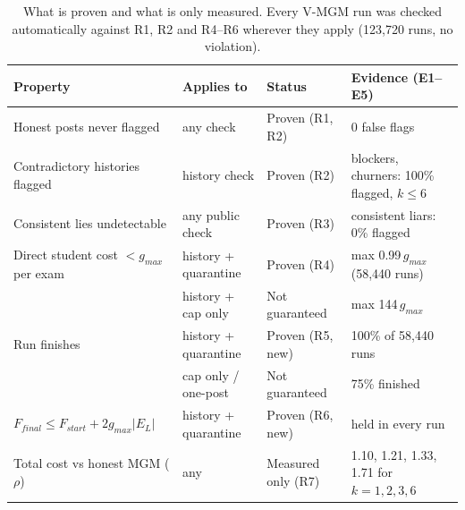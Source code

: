 \begin{table}[t]
\centering
\small
\caption{What is proven and what is only measured. Every V-MGM run was checked automatically against R1, R2 and R4--R6 wherever they apply (123,720 runs, no violation).}
\label{tab:guarantees}
\begin{tabular}{llll}
\toprule
Property & Applies to & Status & Evidence (E1--E5) \\
\midrule
Honest posts never flagged & any check & Proven (R1, R2) & 0 false flags \\
Contradictory histories flagged & history check & Proven (R2) & blockers, churners: 100\% flagged, $k\le 6$ \\
Consistent lies undetectable & any public check & Proven (R3) & consistent liars: 0\% flagged \\
Direct student cost $< g_{max}$ per exam & history + quarantine & Proven (R4) & max 0.99$\,g_{max}$ (58,440 runs) \\
 & history + cap only & Not guaranteed & max 144$\,g_{max}$ \\
Run finishes & history + quarantine & Proven (R5, new) & 100\% of 58,440 runs \\
 & cap only / one-post & Not guaranteed & 75\% finished \\
$F_{final}\le F_{start}+2g_{max}|E_L|$ & history + quarantine & Proven (R6, new) & held in every run \\
Total cost vs honest MGM ($\rho$) & any & Measured only (R7) & 1.10, 1.21, 1.33, 1.71 for $k=1,2,3,6$ \\
\bottomrule
\end{tabular}
\end{table}
